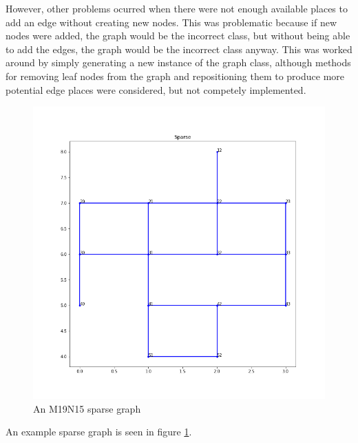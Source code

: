 \documentclass{article}
\begin{document}
However, other problems ocurred when there were not enough available places to add an edge without creating new nodes. This was problematic because if new nodes were added, the graph would be the incorrect class, but without being able to add the edges, the graph would be the incorrect class anyway. This was worked around by simply generating a new instance of the graph class, although methods for removing leaf nodes from the graph and repositioning them to produce more potential edge places were considered, but not competely implemented.
\begin{figure}[h]
    \includegraphics[width=\textwidth]{sparse}
    \caption{An M19N15 sparse graph}
    \label{fig:sparse}
\end{figure}

An example sparse graph is seen in figure \ref{fig:sparse}.
\end{document}
